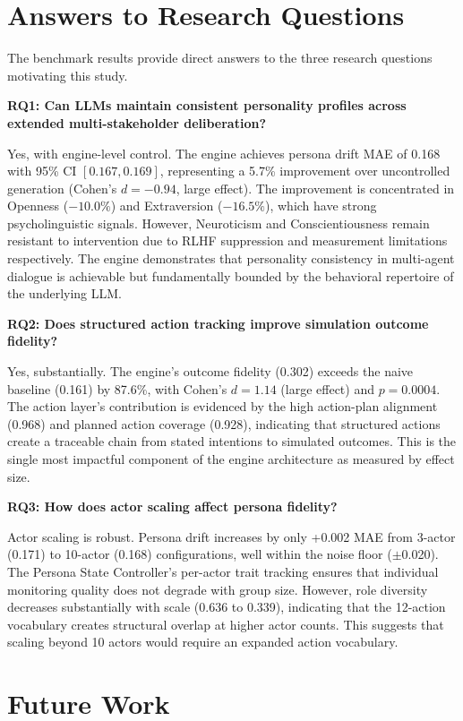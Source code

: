 \section{Answers to Research Questions}

The benchmark results provide direct answers to the three research questions motivating this study.

\textbf{RQ1: Can LLMs maintain consistent personality profiles across extended multi-stakeholder deliberation?}

Yes, with engine-level control. The engine achieves persona drift MAE of 0.168 with 95\% CI $[0.167, 0.169]$, representing a 5.7\% improvement over uncontrolled generation (Cohen's $d = -0.94$, large effect). The improvement is concentrated in Openness ($-10.0\%$) and Extraversion ($-16.5\%$), which have strong psycholinguistic signals. However, Neuroticism and Conscientiousness remain resistant to intervention due to RLHF suppression and measurement limitations respectively. The engine demonstrates that personality consistency in multi-agent dialogue is achievable but fundamentally bounded by the behavioral repertoire of the underlying LLM.

\textbf{RQ2: Does structured action tracking improve simulation outcome fidelity?}

Yes, substantially. The engine's outcome fidelity (0.302) exceeds the naive baseline (0.161) by 87.6\%, with Cohen's $d = 1.14$ (large effect) and $p = 0.0004$. The action layer's contribution is evidenced by the high action-plan alignment (0.968) and planned action coverage (0.928), indicating that structured actions create a traceable chain from stated intentions to simulated outcomes. This is the single most impactful component of the engine architecture as measured by effect size.

\textbf{RQ3: How does actor scaling affect persona fidelity?}

Actor scaling is robust. Persona drift increases by only +0.002 MAE from 3-actor (0.171) to 10-actor (0.168) configurations, well within the noise floor ($\pm$0.020). The Persona State Controller's per-actor trait tracking ensures that individual monitoring quality does not degrade with group size. However, role diversity decreases substantially with scale (0.636 to 0.339), indicating that the 12-action vocabulary creates structural overlap at higher actor counts. This suggests that scaling beyond 10 actors would require an expanded action vocabulary.


\section{Future Work}

